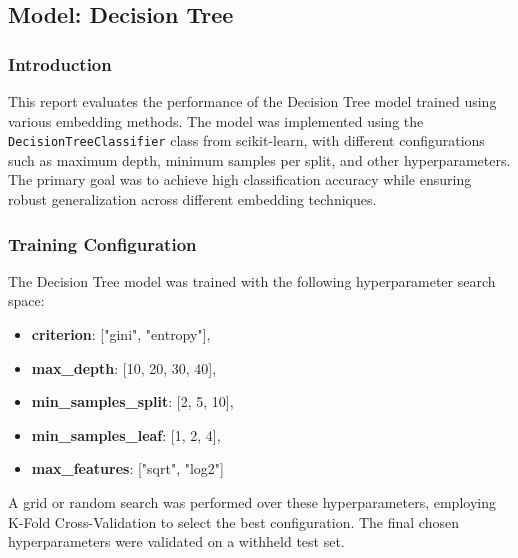 \subsection{Model: Decision Tree}

\subsubsection{Introduction}
This report evaluates the performance of the Decision Tree model trained using various embedding methods. The model was implemented using the \texttt{DecisionTreeClassifier} class from scikit-learn, with different configurations such as maximum depth, minimum samples per split, and other hyperparameters. The primary goal was to achieve high classification accuracy while ensuring robust generalization across different embedding techniques.

\subsubsection{Training Configuration}
The Decision Tree model was trained with the following hyperparameter search space:
\begin{itemize}
    \item \textbf{criterion}:  ["gini", "entropy"],
    \item \textbf{max\_depth}: [10, 20, 30, 40],
    \item \textbf{min\_samples\_split}: [2, 5, 10],
    \item \textbf{min\_samples\_leaf}: [1, 2, 4],
    \item \textbf{max\_features}: ["sqrt", "log2"]
\end{itemize}


A grid or random search was performed over these hyperparameters, employing K-Fold Cross-Validation to select the best configuration. The final chosen hyperparameters were validated on a withheld test set.

